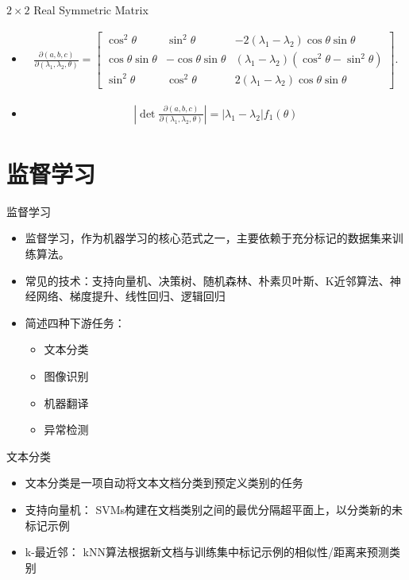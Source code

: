 \documentclass[UTF8,AutoFakeBold,AutoFakeSlant]{beamer}
\begin{document}
\begin{frame}{$2\times 2$ Real Symmetric Matrix}
    \begin{itemize}
        \item
              \begin{align*}
                  \frac{\partial(a,b,c)}{\partial(\lambda_1,\lambda_2,\theta)}=\begin{bmatrix}\cos^2\theta&\sin^2\theta&-2(\lambda_1-\lambda_2)\cos\theta\sin\theta\\\cos\theta\sin\theta&-\cos\theta\sin\theta&(\lambda_1-\lambda_2)(\cos^2\theta-\sin^2\theta)\\\sin^2\theta&\cos^2\theta&2(\lambda_1-\lambda_2)\cos\theta\sin\theta\end{bmatrix}.
              \end{align*}
        \item \begin{align*}
                  \left|\det\frac{\partial(a,b,c)}{\partial(\lambda_1,\lambda_2,\theta)}\right|=|\lambda_1-\lambda_2|f_1(\theta)
              \end{align*}
    \end{itemize}
\end{frame}

\section{监督学习}
\begin{frame}{监督学习}
    \begin{itemize}
        \item 监督学习，作为机器学习的核心范式之一，主要依赖于充分标记的数据集来训练算法。
        \item 常见的技术：支持向量机、决策树、随机森林、朴素贝叶斯、K近邻算法、神经网络、梯度提升、线性回归、逻辑回归
        \item 简述四种下游任务：
              \begin{itemize}
                  \item 文本分类
                  \item 图像识别
                  \item 机器翻译
                  \item 异常检测
              \end{itemize}
    \end{itemize}
\end{frame}

\begin{frame}{文本分类}
    \small
    \begin{itemize}
        \item 文本分类是一项自动将文本文档分类到预定义类别的任务
        \item 支持向量机： SVMs构建在文档类别之间的最优分隔超平面上，以分类新的未标记示例
        \item k-最近邻： kNN算法根据新文档与训练集中标记示例的相似性/距离来预测类别
    \end{itemize}
\end{frame}
\end{document}
